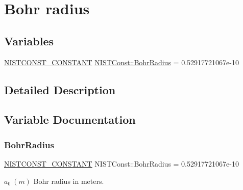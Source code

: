 \hypertarget{group___n_i_s_t_const-_bohr_radius}{}\section{Bohr radius}
\label{group___n_i_s_t_const-_bohr_radius}
\subsection*{Variables}
\begin{DoxyCompactItemize}
\item 
\mbox{\hyperlink{group___n_i_s_t_const-_macros_ga2b0fc1d7452373f816175dd86ce26729}{N\+I\+S\+T\+C\+O\+N\+S\+T\+\_\+\+C\+O\+N\+S\+T\+A\+NT}} \mbox{\hyperlink{group___n_i_s_t_const-_bohr_radius_ga9a18bd8c20d78ff8ad8747cdd623a07b}{N\+I\+S\+T\+Const\+::\+Bohr\+Radius}} = 0.\+52917721067e-\/10
\end{DoxyCompactItemize}


\subsection{Detailed Description}


\subsection{Variable Documentation}
\mbox{\label{group___n_i_s_t_const-_bohr_radius_ga9a18bd8c20d78ff8ad8747cdd623a07b}} 
\subsubsection{\texorpdfstring{Bohr\+Radius}{BohrRadius}}
{\footnotesize\ttfamily \mbox{\hyperlink{group___n_i_s_t_const-_macros_ga2b0fc1d7452373f816175dd86ce26729}{N\+I\+S\+T\+C\+O\+N\+S\+T\+\_\+\+C\+O\+N\+S\+T\+A\+NT}} N\+I\+S\+T\+Const\+::\+Bohr\+Radius = 0.\+52917721067e-\/10}

$a_0 \ (m)$ Bohr radius in meters. 